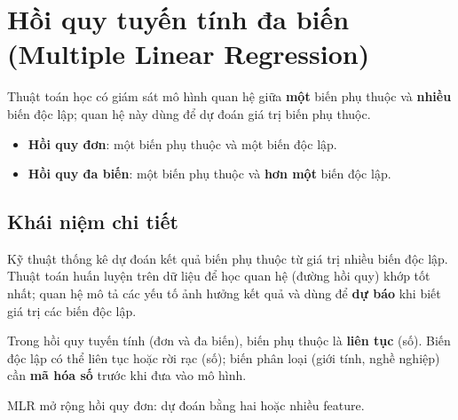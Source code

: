 \section{Hồi quy tuyến tính đa biến (Multiple Linear Regression)}
\label{sec:multiple-linear-regression}

\begin{dinhnghia}[title={Hồi quy tuyến tính đa biến (MLR)}]
Thuật toán học có giám sát mô hình quan hệ giữa \textbf{một} biến phụ thuộc và \textbf{nhiều} biến độc lập; quan hệ này dùng để dự đoán giá trị biến phụ thuộc.
\end{dinhnghia}

\begin{phuongphap}[title={Hai loại hồi quy tuyến tính}]
\begin{itemize}
  \item \textbf{Hồi quy đơn}: một biến phụ thuộc và một biến độc lập.
  \item \textbf{Hồi quy đa biến}: một biến phụ thuộc và \textbf{hơn một} biến độc lập.
\end{itemize}
\end{phuongphap}

\subsection{Khái niệm chi tiết}

\begin{dinhnghia}[title={MLR trong học máy}]
Kỹ thuật thống kê dự đoán kết quả biến phụ thuộc từ giá trị nhiều biến độc lập.
Thuật toán huấn luyện trên dữ liệu để học quan hệ (đường hồi quy) khớp tốt nhất; quan hệ mô tả các yếu tố ảnh hưởng kết quả và dùng để \textbf{dự báo} khi biết giá trị các biến độc lập.
\end{dinhnghia}

\begin{phuongphap}[title={Kiểu biến}]
Trong hồi quy tuyến tính (đơn và đa biến), biến phụ thuộc là \textbf{liên tục} (số).
Biến độc lập có thể liên tục hoặc rời rạc (số); biến phân loại (giới tính, nghề nghiệp) cần \textbf{mã hóa số} trước khi đưa vào mô hình.
\end{phuongphap}

\begin{ynghia}[title={Mở rộng hồi quy đơn}]
MLR mở rộng hồi quy đơn: dự đoán bằng hai hoặc nhiều feature.
\end{ynghia}

